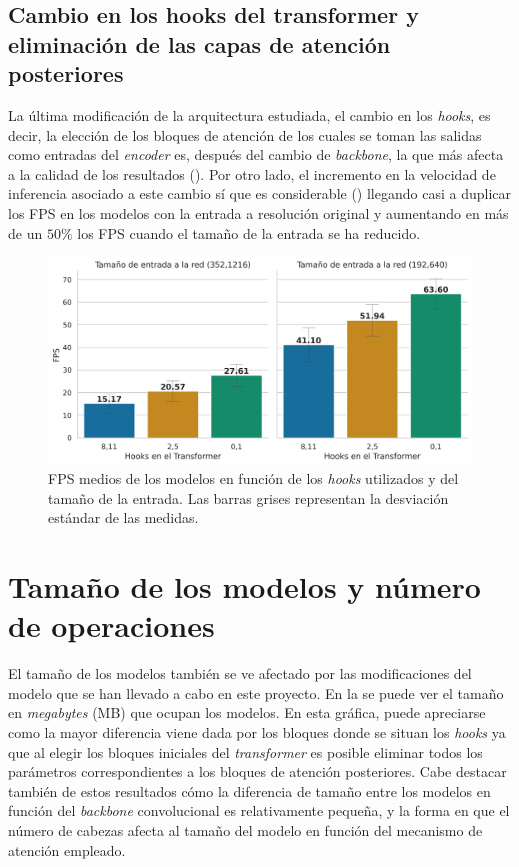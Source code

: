 \subsection{Cambio en los hooks del transformer y eliminación de las capas de atención posteriores}\label{resultados-cuantitativos-hooks}
La última modificación de la arquitectura estudiada, el cambio en los \textit{hooks}, es decir, la elección de los bloques de atención de los cuales se toman las salidas como entradas del \textit{encoder} es, después del cambio de \textit{backbone}, la que más afecta a la calidad de los resultados (). Por otro lado, el incremento en la velocidad de inferencia asociado a este cambio sí que es considerable () llegando casi a duplicar los FPS en los modelos con la entrada a resolución original y aumentando en más de un $50\%$ los FPS cuando el tamaño de la entrada se ha reducido.

\begin{figure}[H]
\centering
\includegraphics[width=0.85\linewidth]{imagenes/Resultados/velocidad_inferencia_hooks.png} 
\captionsetup{width=.9\linewidth}
\caption{FPS medios de los modelos en función de los \textit{hooks} utilizados y del tamaño de la entrada. Las barras grises representan la desviación estándar de las medidas.}
\label{fig:resultados-inf-hooks}
\end{figure}















\section{Tamaño de los modelos y número de operaciones}
El tamaño de los modelos también se ve afectado por las modificaciones del modelo que se han llevado a cabo en este proyecto. En la  se puede ver el tamaño en \textit{megabytes} (MB) que ocupan los modelos. En esta gráfica, puede apreciarse como la mayor diferencia viene dada por los bloques donde se situan los \textit{hooks} ya que al elegir los bloques iniciales del \textit{transformer} es posible eliminar todos los parámetros correspondientes a los bloques de atención posteriores. Cabe destacar también de estos resultados cómo la diferencia de tamaño entre los modelos en función del \textit{backbone} convolucional es relativamente pequeña, y la forma en que el número de cabezas afecta al tamaño del modelo en función del mecanismo de atención empleado.


